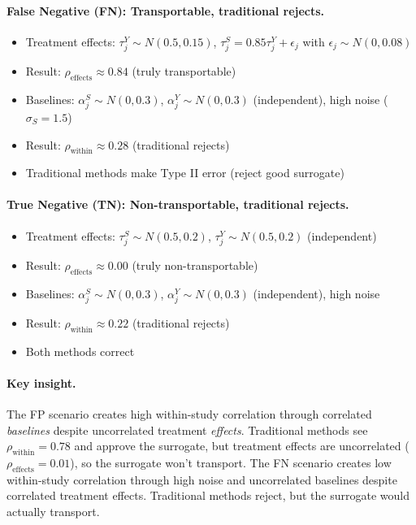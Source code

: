 \documentclass{article}
\begin{document}
\paragraph{False Negative (FN): Transportable, traditional rejects.}
\begin{itemize}
    \item Treatment effects: $\tau_j^Y \sim N(0.5, 0.15)$, $\tau_j^S = 0.85 \tau_j^Y + \epsilon_j$ with $\epsilon_j \sim N(0, 0.08)$
    \item Result: $\rho_{\text{effects}} \approx 0.84$ (truly transportable)
    \item Baselines: $\alpha_j^S \sim N(0, 0.3)$, $\alpha_j^Y \sim N(0, 0.3)$ (independent), high noise ($\sigma_S = 1.5$)
    \item Result: $\rho_{\text{within}} \approx 0.28$ (traditional rejects)
    \item Traditional methods make Type II error (reject good surrogate)
\end{itemize}

\paragraph{True Negative (TN): Non-transportable, traditional rejects.}
\begin{itemize}
    \item Treatment effects: $\tau_j^S \sim N(0.5, 0.2)$, $\tau_j^Y \sim N(0.5, 0.2)$ (independent)
    \item Result: $\rho_{\text{effects}} \approx 0.00$ (truly non-transportable)
    \item Baselines: $\alpha_j^S \sim N(0, 0.3)$, $\alpha_j^Y \sim N(0, 0.3)$ (independent), high noise
    \item Result: $\rho_{\text{within}} \approx 0.22$ (traditional rejects)
    \item Both methods correct
\end{itemize}

\paragraph{Key insight.} The FP scenario creates high within-study correlation through correlated \emph{baselines} despite uncorrelated treatment \emph{effects}. Traditional methods see $\rho_{\text{within}} = 0.78$ and approve the surrogate, but treatment effects are uncorrelated ($\rho_{\text{effects}} = 0.01$), so the surrogate won't transport. The FN scenario creates low within-study correlation through high noise and uncorrelated baselines despite correlated treatment effects. Traditional methods reject, but the surrogate would actually transport.
\end{document}
